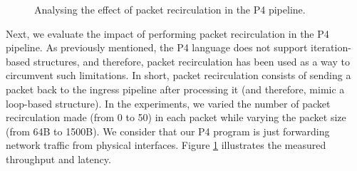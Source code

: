 \begin{figure}[!tb]
\centering
{}
        \caption{Analysing the effect of packet recirculation in the P4 pipeline.}
        \label{fig2}
\end{figure}

Next, we evaluate the impact of performing packet recirculation in the P4 pipeline. As previously mentioned, the P4 language does not support iteration-based structures, and therefore, packet recirculation has been used as a way to circumvent such limitations. In short, packet recirculation consists of sending a packet back to the ingress pipeline after processing it (and therefore, mimic a loop-based structure). In the experiments, we varied the number of packet recirculation made (from 0 to 50) in each packet while varying the packet size (from 64B to 1500B). We consider that our P4 program is just forwarding network traffic from physical interfaces. Figure \ref{fig2} illustrates the measured throughput and latency. 

